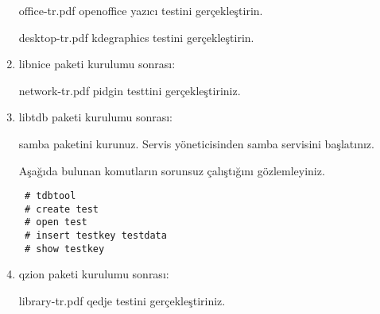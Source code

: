 \documentclass[a4paper,10pt]{article}
\begin{document}
\begin{enumerate}
office-tr.pdf openoffice yazıcı testini gerçekleştirin.

desktop-tr.pdf kdegraphics testini gerçekleştirin.

\item libnice paketi kurulumu sonrası:

network-tr.pdf pidgin testtini gerçekleştiriniz.

\item libtdb paketi kurulumu sonrası:

samba paketini kurunuz. Servis yöneticisinden samba servisini başlatınız.

Aşağıda bulunan komutların sorunsuz çalıştığını gözlemleyiniz.
\begin{verbatim}
 # tdbtool
 # create test
 # open test 
 # insert testkey testdata
 # show testkey
\end{verbatim}
\item qzion paketi kurulumu sonrası:

library-tr.pdf qedje testini gerçekleştiriniz.

\end{enumerate}
\end{document}
